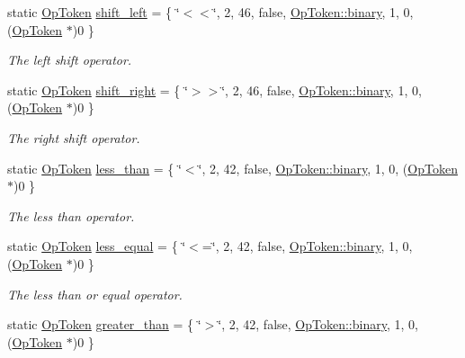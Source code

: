 \begin{DoxyCompactItemize}
static \mbox{\hyperlink{class_op_token}{Op\+Token}} \mbox{\hyperlink{class_print_c_a49158efdd9a95cc787de8e7fb499b621}{shift\+\_\+left}} = \{ \char`\"{}$<$$<$\char`\"{}, 2, 46, false, \mbox{\hyperlink{class_op_token_af41c7f108d5662ede7765c5a6c44eaffa3a2ec63522a9329a71ddbe8adc3e752d}{Op\+Token\+::binary}}, 1, 0, (\mbox{\hyperlink{class_op_token}{Op\+Token}} $\ast$)0 \}
\begin{DoxyCompactList}\small\item\em The {\itshape left} {\itshape shift} operator. \end{DoxyCompactList}\item 
static \mbox{\hyperlink{class_op_token}{Op\+Token}} \mbox{\hyperlink{class_print_c_ac6a0bf963ec7eeb61a71e5e74f2ec803}{shift\+\_\+right}} = \{ \char`\"{}$>$$>$\char`\"{}, 2, 46, false, \mbox{\hyperlink{class_op_token_af41c7f108d5662ede7765c5a6c44eaffa3a2ec63522a9329a71ddbe8adc3e752d}{Op\+Token\+::binary}}, 1, 0, (\mbox{\hyperlink{class_op_token}{Op\+Token}} $\ast$)0 \}
\begin{DoxyCompactList}\small\item\em The {\itshape right} {\itshape shift} operator. \end{DoxyCompactList}\item 
static \mbox{\hyperlink{class_op_token}{Op\+Token}} \mbox{\hyperlink{class_print_c_a2ce89de69cae922cb42cf0ee12c6dd84}{less\+\_\+than}} = \{ \char`\"{}$<$\char`\"{}, 2, 42, false, \mbox{\hyperlink{class_op_token_af41c7f108d5662ede7765c5a6c44eaffa3a2ec63522a9329a71ddbe8adc3e752d}{Op\+Token\+::binary}}, 1, 0, (\mbox{\hyperlink{class_op_token}{Op\+Token}} $\ast$)0 \}
\begin{DoxyCompactList}\small\item\em The {\itshape less} {\itshape than} operator. \end{DoxyCompactList}\item 
static \mbox{\hyperlink{class_op_token}{Op\+Token}} \mbox{\hyperlink{class_print_c_a22c98035ceb2682d83cbd0e2aa088c95}{less\+\_\+equal}} = \{ \char`\"{}$<$=\char`\"{}, 2, 42, false, \mbox{\hyperlink{class_op_token_af41c7f108d5662ede7765c5a6c44eaffa3a2ec63522a9329a71ddbe8adc3e752d}{Op\+Token\+::binary}}, 1, 0, (\mbox{\hyperlink{class_op_token}{Op\+Token}} $\ast$)0 \}
\begin{DoxyCompactList}\small\item\em The {\itshape less} {\itshape than} {\itshape or} {\itshape equal} operator. \end{DoxyCompactList}\item 
static \mbox{\hyperlink{class_op_token}{Op\+Token}} \mbox{\hyperlink{class_print_c_a707432f4ffaa366edf116e973e541924}{greater\+\_\+than}} = \{ \char`\"{}$>$\char`\"{}, 2, 42, false, \mbox{\hyperlink{class_op_token_af41c7f108d5662ede7765c5a6c44eaffa3a2ec63522a9329a71ddbe8adc3e752d}{Op\+Token\+::binary}}, 1, 0, (\mbox{\hyperlink{class_op_token}{Op\+Token}} $\ast$)0 \}

\end{DoxyCompactItemize}
